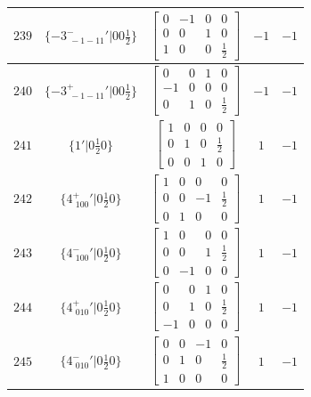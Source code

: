 \documentclass[fleqn,8pt]{jsarticle}
\begin{document}
\begin{longtable}{ccccc}
$ 239 $ & $ \{-3^{-}_{\,\,-1-11}{}'|0 0 \frac{1}{2}\} $ & $ \begin{bmatrix} 0 & -1 & 0 & 0 \\ 0 & 0 & 1 & 0 \\ 1 & 0 & 0 & \frac{1}{2} \end{bmatrix} $ & $ -1 $ & $ -1 $ \\ \hline
$ 240 $ & $ \{-3^{+}_{\,\,-1-11}{}'|0 0 \frac{1}{2}\} $ & $ \begin{bmatrix} 0 & 0 & 1 & 0 \\ -1 & 0 & 0 & 0 \\ 0 & 1 & 0 & \frac{1}{2} \end{bmatrix} $ & $ -1 $ & $ -1 $ \\ \hline
$ 241 $ & $ \{1{}'|0 \frac{1}{2} 0\} $ & $ \begin{bmatrix} 1 & 0 & 0 & 0 \\ 0 & 1 & 0 & \frac{1}{2} \\ 0 & 0 & 1 & 0 \end{bmatrix} $ & $ 1 $ & $ -1 $ \\ \hline
$ 242 $ & $ \{4^{+}_{\,\,100}{}'|0 \frac{1}{2} 0\} $ & $ \begin{bmatrix} 1 & 0 & 0 & 0 \\ 0 & 0 & -1 & \frac{1}{2} \\ 0 & 1 & 0 & 0 \end{bmatrix} $ & $ 1 $ & $ -1 $ \\ \hline
$ 243 $ & $ \{4^{-}_{\,\,100}{}'|0 \frac{1}{2} 0\} $ & $ \begin{bmatrix} 1 & 0 & 0 & 0 \\ 0 & 0 & 1 & \frac{1}{2} \\ 0 & -1 & 0 & 0 \end{bmatrix} $ & $ 1 $ & $ -1 $ \\ \hline
$ 244 $ & $ \{4^{+}_{\,\,010}{}'|0 \frac{1}{2} 0\} $ & $ \begin{bmatrix} 0 & 0 & 1 & 0 \\ 0 & 1 & 0 & \frac{1}{2} \\ -1 & 0 & 0 & 0 \end{bmatrix} $ & $ 1 $ & $ -1 $ \\ \hline
$ 245 $ & $ \{4^{-}_{\,\,010}{}'|0 \frac{1}{2} 0\} $ & $ \begin{bmatrix} 0 & 0 & -1 & 0 \\ 0 & 1 & 0 & \frac{1}{2} \\ 1 & 0 & 0 & 0 \end{bmatrix} $ & $ 1 $ & $ -1 $ \\ \hline

\end{longtable}
\end{document}
